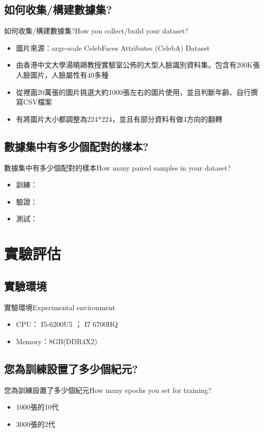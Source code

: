 \documentclass[utf8x]{beamer}
\begin{document}
\subsection{如何收集/構建數據集?}
\begin{frame}{如何收集/構建數據集?}{How you collect/build your dataset?}
  \begin{itemize}
  \item {
    圖片來源：arge-scale CelebFaces Attributes (CelebA) Dataset
  }
  \item {
    由香港中文大學湯曉鷗教授實驗室公佈的大型人臉識別資料集。包含有200K張人臉圖片，人臉屬性有40多種
  }
 \item {
    從裡面20萬張的圖片挑選大約1000張左右的圖片使用，並且判斷年齡、自行撰寫CSV檔案
  }
 \item {
    有將圖片大小都調整為224*224，並且有部分資料有做4方向的翻轉
  }
  \end{itemize}
\end{frame}
\subsection{數據集中有多少個配對的樣本?}
\begin{frame}{數據集中有多少個配對的樣本}{How many paired samples in your dataset?}
  \begin{itemize}
  \item {
    訓練：
  }
  \item {
    驗證：
  }
 \item {
    測試：
  }
  \end{itemize}
\end{frame}
\section{實驗評估}
\subsection{實驗環境}
\begin{frame}{實驗環境}{Experimental environment}
 \begin{itemize}
  \item {
    CPU： I5-6200U5 ； I7 6700HQ
  }
\item {
    Memory：8GB(DDR4X2)
  }
  \end{itemize}
\end{frame}
\subsection{您為訓練設置了多少個紀元?}
\begin{frame}{您為訓練設置了多少個紀元}{How many epochs you set for training?}
 \begin{itemize}
  \item {
    1000張的10代
  }
\item {
    3000張的2代
  }
  \end{itemize}
\end{frame}
\end{document}
